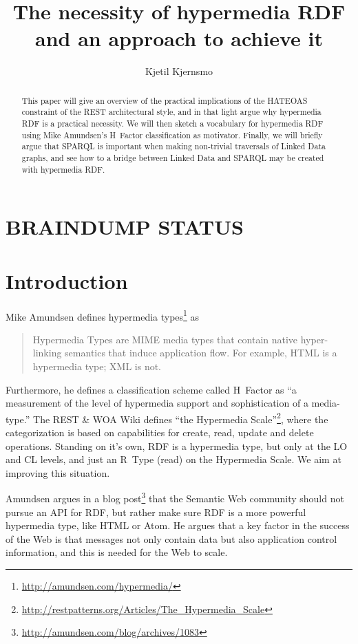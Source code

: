 \documentclass{llncs}
\title{The necessity of hypermedia RDF and an approach to achieve it}
\author{Kjetil Kjernsmo\inst{1}}
\institute{Department of Informatics,
Postboks 1080 Blindern,
0316 Oslo, Norway
\email{kjekje@ifi.uio.no}}
\begin{document}
\maketitle



\begin{abstract}
This paper will give an overview of the practical implications of the
HATEOAS constraint of the REST architectural style, and in that light argue why
hypermedia RDF is a practical necessity. We will then sketch a
vocabulary for hypermedia RDF using Mike Amundsen's H~Factor
classification as motivator. Finally, we will briefly argue that
SPARQL is important when making non-trivial traversals of Linked Data
graphs, and see how to a bridge between Linked Data and SPARQL may be
created with hypermedia RDF.
\end{abstract}

\section*{BRAINDUMP STATUS}

\section{Introduction}


Mike Amundsen defines hypermedia types\footnote{\url{http://amundsen.com/hypermedia/}} as 
\begin{quote}
Hypermedia Types are MIME media types that contain native
hyper-linking semantics that induce application flow. For example,
HTML is a hypermedia type; XML is not.
\end{quote}
Furthermore, he defines a classification scheme called H~Factor as ``a
measurement of the level of hypermedia support and sophistication of a
media-type.'' The REST & WOA Wiki defines ``the Hypermedia
Scale''\footnote{\url{http://restpatterns.org/Articles/The_Hypermedia_Scale}},
where the categorization is based on capabilities for create, read,
update and delete operations.  Standing on it's own, RDF is a
hypermedia type, but only at the \textsf{LO} and \textsf{CL} levels,
and just an R~Type (read) on the Hypermedia Scale. We aim at improving
this situation.

Amundsen argues in a blog
post\footnote{\url{http://amundsen.com/blog/archives/1083}} that the
Semantic Web community should not pursue an API for RDF, but rather
make sure RDF is a more powerful hypermedia type, like HTML or
Atom. He argues that a key factor in the success of the Web is that
messages not only contain data but also application control
information, and this is needed for the Web to scale.
\end{document}
